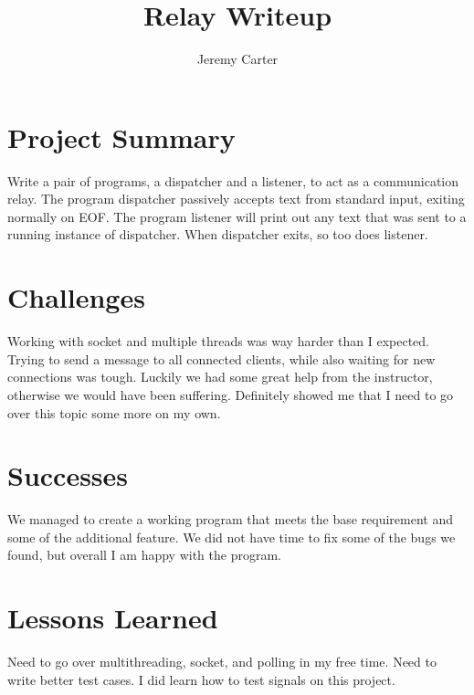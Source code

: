 \documentclass{article}
\title{Relay Writeup}
\author{Jeremy Carter}
\begin{document}
  \maketitle
    \section{Project Summary}
    Write a pair of programs, a dispatcher and a listener, to act as a communication relay.
    The program dispatcher passively accepts text from standard input, exiting normally on EOF.
    The program listener will print out any text that was sent to a running instance of dispatcher. When dispatcher exits, so too does listener.

    \section{Challenges}
    Working with socket and multiple threads was way harder than I expected. Trying to send a message to all connected clients, while also waiting for new connections was tough. Luckily we had some great help from the instructor, otherwise we would have been suffering. Definitely showed me that I need to go over this topic some more on my own.

    \section{Successes}
    We managed to create a working program that meets the base requirement and some of the additional feature. We did not have time to fix some of the bugs we found, but overall I am happy with the program.

    \section{Lessons Learned}
    Need to go over multithreading, socket, and polling in  my free time.
    Need to write better test cases. I did learn how to test signals on this project.
\end{document}
